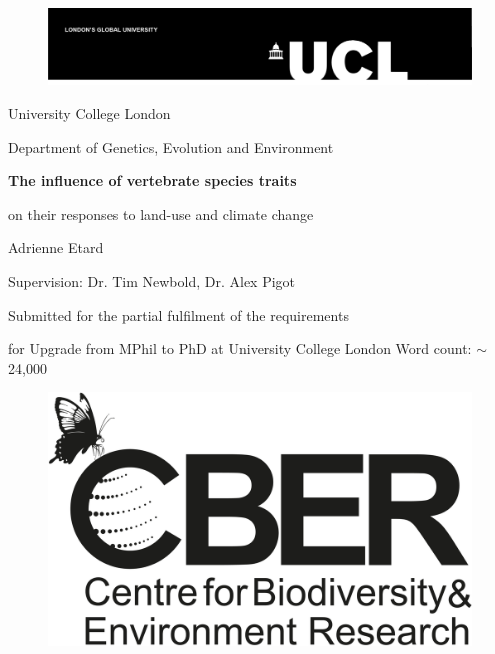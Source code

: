 \date{\today}

\begin{titlepage}

\begin{figure}
{\includegraphics[scale=0.8]{figures/UCL_logo}}
\end{figure}

\begin{center}

{\Large
University College London\par
Department of Genetics, Evolution and Environment\par
}
%
\vskip 4cm
%
{\huge \bf
The influence of vertebrate species traits  \par
on their responses to land-use and climate change\par
}
%
\vskip 2cm
%
{\Large
Adrienne Etard\par
Supervision: Dr. Tim Newbold, Dr. Alex Pigot

\vskip 1cm

\makeatletter
\@date
\vskip 0.5cm
\par
Submitted for the partial fulfilment of the requirements \par 
for Upgrade from MPhil to PhD at University College London
\vskip 0.5cm
 Word count: $\sim$24,000
\vskip 1cm
}
\end{center}
\begin{figure}[h!]
\centering
{\includegraphics[scale=0.09]{figures/cber_logo}}
\end{figure}
\end{titlepage}

\makeatother